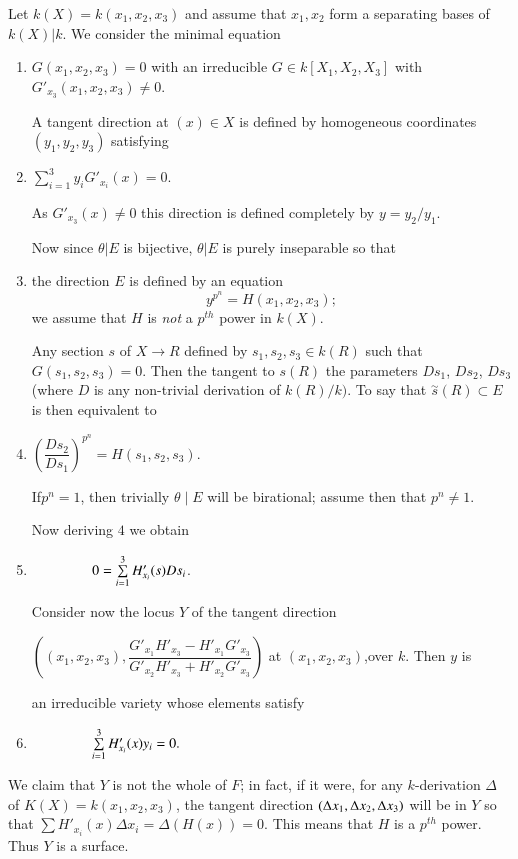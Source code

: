 Let $k(X) =  k(x_1, x_2, x_3)$ and assume that $x_1,x_2$ form a
separating bases of $k (X)|k$. We consider the minimal equation 
\begin{enumerate}[1).] 
\item  $ G(x_1,x_2,x_3)=0$ with an  irreducible $ G \in k [X_1,
  X_2,X_3]$ with\break  $G'_{x_3} (x_1,x_2,x_3) \ne 0$. 
  
  A tangent direction at $(x) \in X$ is defined by homogeneous
  coordinates $ ( y_1,y_2,y_3)$ satisfying 
\item $  \sum\limits_{i=1}^{3}y_i G'_{x_i} (x)=0$.
  
  As $G'_{x_3}(x) \ne 0$ this direction is defined completely by
  $y=y_2/y_1$. 

  Now since $\theta | E$ is  bijective, $\theta | E$ is purely
  inseparable so that 
\item  the direction $E$ is defined by an equation
  $$
  y^{p^n}=H (x_1,x_2,x_3);
  $$
  we assume that $H$ is \textit {not } a $p^{th}$ power in $k(X)$.
 
  Any section $s$ of $X \rightarrow R$ defined by $s_1,s_2,s_3 \in
  k(R)$ such that $ G (s_1,s_2,s_3)=0$. Then the tangent to $s(R)$ the
  parameters $Ds_1$, $Ds_2$, $Ds_3$ (where $D$ is any non-trivial derivation
  of  $k (R)/k)$. To say that $ \overset{\sim} s  (R) \subset E $  is
  then equivalent to 
\item $\left(\dfrac{Ds_2} {Ds_1}\right)^{p^n}= H (s_1,s_2,s_3)$.
 
  If\pageoriginale $p^n=1$, then trivially $\theta \mid E$ will be birational;
  assume then that $ p^n \neq 1$. 

  Now deriving $4$ we obtain
\item $\hspace{1.5cm} 0 = \sum\limits^{3}_{i=1} H_{x_{i}}' (s)Ds_i$.

  Consider  now the locus $Y$ of the tangent direction

  $\left( (x_1, x_2, x_3), \dfrac{G'_{x_1} H'_{x_3} -H'_{x_1}
    G'_{x_3}}{G'_{x_2} H'_{x_3} + H'_{x_2} G'_{x_3}}  \right)$ at
  $(x_1,x_2,x_3)$,over $k$. Then $y$ is  
 
  an irreducible variety whose elements satisfy
\item $ \hspace{1.5cm} \sum\limits_{i=1}^{3} H'_{x_i}(x) y_i=0.$
\end{enumerate}

We claim that $Y$ is not the whole of $F$; in fact, if it were, for
any $k$-derivation $ \Delta $ of $K(X) =k(x_1,x_2,x_3)$, the tangent
direction $(\Delta x_1,\Delta x_2,\break\Delta x_3)$ will be in $Y$ so that  
$\sum H'_{x_i} (x)\Delta x_i=\Delta(H(x))=0$. This means that $H$ is a
$p^{th}$ power. Thus $Y$ is a surface.  

